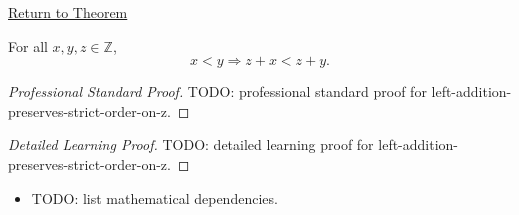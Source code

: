 \newpage
{}
\label{prf:left-addition-preserves-strict-order-on-z}

\begin{remark*}[Return]
\hyperref[thm:left-addition-preserves-strict-order-on-z]{Return to Theorem}
\end{remark*}

\begin{theorem*}
For all $x,y,z\in\mathbb{Z}$,
\[
x<y \Longrightarrow z+x<z+y.
\]
\end{theorem*}

\begin{proof}[Professional Standard Proof]
\LRAProofBodyStart
TODO: professional standard proof for left-addition-preserves-strict-order-on-z.
\end{proof}

\begin{proof}[Detailed Learning Proof]
\LRAProofBodyStart
TODO: detailed learning proof for left-addition-preserves-strict-order-on-z.
\end{proof}

\begin{remark*}
\end{remark*}

\begin{dependencies}
\begin{itemize}
  \item TODO: list mathematical dependencies.
\end{itemize}
\end{dependencies}

\clearpage
